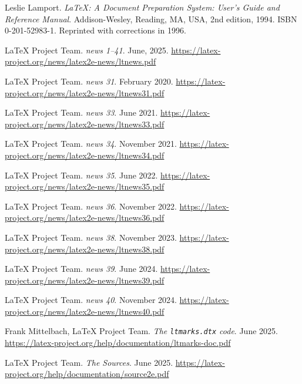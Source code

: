 \documentclass{ltnews}
\begin{document}
\begin{thebibliography}{9}\frenchspacing


Leslie Lamport.
\newblock \emph{{\LaTeX}: {A} Document Preparation System: User's Guide and Reference
  Manual}.
\newblock \mbox{Addison}-Wesley, Reading, MA, USA, 2nd edition, 1994.
\newblock ISBN 0-201-52983-1.
\newblock Reprinted with corrections in 1996.

 \LaTeX{} Project Team.
  \emph{\LaTeXe{} news 1--41}. June, 2025.
  \url{https://latex-project.org/news/latex2e-news/ltnews.pdf}

 \LaTeX{} Project Team.
  \emph{\LaTeXe{} news 31}. February 2020.
  \url{https://latex-project.org/news/latex2e-news/ltnews31.pdf}

 \LaTeX{} Project Team.
  \emph{\LaTeXe{} news 33}. June 2021.
  \url{https://latex-project.org/news/latex2e-news/ltnews33.pdf}

 \LaTeX{} Project Team.
  \emph{\LaTeXe{} news 34}. November 2021.
  \url{https://latex-project.org/news/latex2e-news/ltnews34.pdf}

 \LaTeX{} Project Team.
  \emph{\LaTeXe{} news 35}. June 2022.
  \url{https://latex-project.org/news/latex2e-news/ltnews35.pdf}

 \LaTeX{} Project Team.
  \emph{\LaTeXe{} news 36}. November 2022.
  \url{https://latex-project.org/news/latex2e-news/ltnews36.pdf}

 \LaTeX{} Project Team.
  \emph{\LaTeXe{} news 38}. November 2023.
  \url{https://latex-project.org/news/latex2e-news/ltnews38.pdf}

 \LaTeX{} Project Team.
  \emph{\LaTeXe{} news 39}. June 2024.
  \url{https://latex-project.org/news/latex2e-news/ltnews39.pdf}

 \LaTeX{} Project Team.
  \emph{\LaTeXe{} news 40}. November 2024.
  \url{https://latex-project.org/news/latex2e-news/ltnews40.pdf}

 Frank Mittelbach, \LaTeX{} Project Team.
  \emph{The \texttt{ltmarks.dtx} code}. June 2025.
  \url{https://latex-project.org/help/documentation/ltmarks-doc.pdf}

 \LaTeX{} Project Team.
  \emph{The \LaTeXe{} Sources}. June 2025.
  \url{https://latex-project.org/help/documentation/source2e.pdf}

\end{thebibliography}
\end{document}
